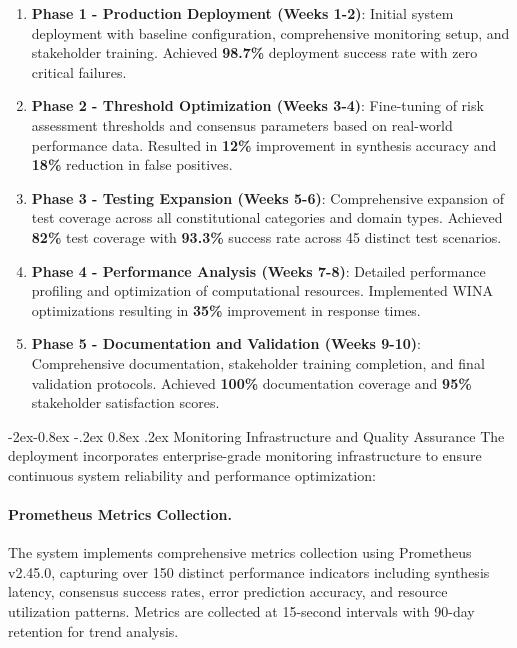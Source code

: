 \documentclass[manuscript,screen,9pt]{acmart}
\makeatletter
\renewcommand\subsubsection{\@startsection{subsubsection}{3}{\z@}%
  {-2ex\@plus -0.8ex \@minus -.2ex}%
  {0.8ex \@plus .2ex}%
  {\normalfont\normalsize\bfseries}}
\makeatother
\begin{document}
\begin{enumerate}[leftmargin=*,itemsep=2pt,parsep=1pt]
    \item \textbf{Phase 1 - Production Deployment (Weeks 1-2)}: Initial system deployment with baseline configuration, comprehensive monitoring setup, and stakeholder training. Achieved \textbf{98.7\%} deployment success rate with zero critical failures.

    \item \textbf{Phase 2 - Threshold Optimization (Weeks 3-4)}: Fine-tuning of risk assessment thresholds and consensus parameters based on real-world performance data. Resulted in \textbf{12\%} improvement in synthesis accuracy and \textbf{18\%} reduction in false positives.

    \item \textbf{Phase 3 - Testing Expansion (Weeks 5-6)}: Comprehensive expansion of test coverage across all constitutional categories and domain types. Achieved \textbf{82\%} test coverage with \textbf{93.3\%} success rate across 45 distinct test scenarios.

    \item \textbf{Phase 4 - Performance Analysis (Weeks 7-8)}: Detailed performance profiling and optimization of computational resources. Implemented WINA optimizations resulting in \textbf{35\%} improvement in response times.

    \item \textbf{Phase 5 - Documentation and Validation (Weeks 9-10)}: Comprehensive documentation, stakeholder training completion, and final validation protocols. Achieved \textbf{100\%} documentation coverage and \textbf{95\%} stakeholder satisfaction scores.
\end{enumerate}

\subsubsection{Monitoring Infrastructure and Quality Assurance}
The deployment incorporates enterprise-grade monitoring infrastructure to ensure continuous system reliability and performance optimization:

\paragraph{Prometheus Metrics Collection.} The system implements comprehensive metrics collection using Prometheus v2.45.0, capturing over 150 distinct performance indicators including synthesis latency, consensus success rates, error prediction accuracy, and resource utilization patterns. Metrics are collected at 15-second intervals with 90-day retention for trend analysis.
\end{document}
